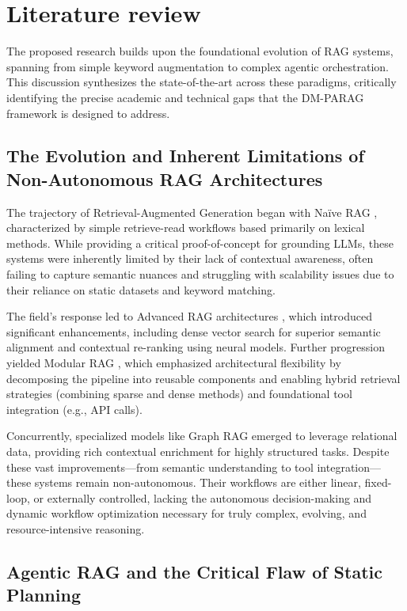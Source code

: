 \documentclass[12pt,en]{elegantpaper}
\begin{document}
\section{Literature review}

The proposed research builds upon the foundational evolution of RAG systems, spanning from simple keyword augmentation to complex agentic orchestration. This discussion synthesizes the state-of-the-art across these paradigms, critically identifying the precise academic and technical gaps that the DM-PARAG framework is designed to address.

\subsection{The Evolution and Inherent Limitations of Non-Autonomous RAG Architectures}

The trajectory of Retrieval-Augmented Generation began with Naïve RAG \cite{jiang2023active}, characterized by simple retrieve-read workflows based primarily on lexical methods. While providing a critical proof-of-concept for grounding LLMs, these systems were inherently limited by their lack of contextual awareness, often failing to capture semantic nuances and struggling with scalability issues due to their reliance on static datasets and keyword matching.

The field's response led to Advanced RAG architectures \cite{gao2023retrieval}, which introduced significant enhancements, including dense vector search for superior semantic alignment and contextual re-ranking using neural models. Further progression yielded Modular RAG \cite{gao2023retrieval}, which emphasized architectural flexibility by decomposing the pipeline into reusable components and enabling hybrid retrieval strategies (combining sparse and dense methods) \cite{karpukhin2020dense} and foundational tool integration (e.g., API calls).

Concurrently, specialized models like Graph RAG \cite{peng2024graph} emerged to leverage relational data, providing rich contextual enrichment for highly structured tasks. Despite these vast improvements—from semantic understanding to tool integration—these systems remain non-autonomous. Their workflows are either linear, fixed-loop, or externally controlled, lacking the autonomous decision-making and dynamic workflow optimization necessary for truly complex, evolving, and resource-intensive reasoning.

\subsection{Agentic RAG and the Critical Flaw of Static Planning}
\end{document}
